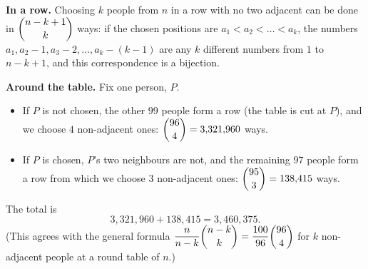 \textbf{In a row.} Choosing $k$ people from $n$ in a row with no two adjacent can be done in $\dbinom{n-k+1}{k}$ ways: if the chosen positions are $a_1<a_2<\dots<a_k$, the numbers $a_1,a_2-1,a_3-2,\dots,a_k-(k-1)$ are any $k$ different numbers from $1$ to $n-k+1$, and this correspondence is a bijection.

\textbf{Around the table.} Fix one person, $P$.
\begin{itemize}
\item If $P$ is not chosen, the other $99$ people form a row (the table is cut at $P$), and we choose $4$ non-adjacent ones: $\dbinom{96}{4}=3{,}321{,}960$ ways.
\item If $P$ is chosen, $P$'s two neighbours are not, and the remaining $97$ people form a row from which we choose $3$ non-adjacent ones: $\dbinom{95}{3}=138{,}415$ ways.
\end{itemize}
The total is
\[
3{,}321{,}960+138{,}415=\boxed{3{,}460{,}375}.
\]
(This agrees with the general formula $\dfrac{n}{n-k}\dbinom{n-k}{k}=\dfrac{100}{96}\dbinom{96}{4}$ for $k$ non-adjacent people at a round table of $n$.)
